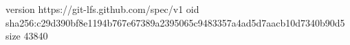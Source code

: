 version https://git-lfs.github.com/spec/v1
oid sha256:c29d390bf8e1194b767e67389a2395065c9483357a4ad5d7aacb10d7340b90d5
size 43840

